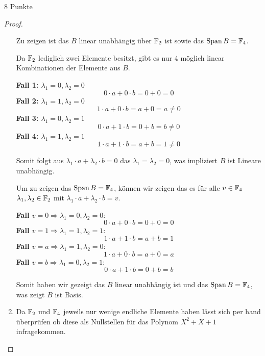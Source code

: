 \documentclass{problemset}
\begin{document}
\begin{problem}{8 Punkte}
\begin{proof}
\begin{enumerate}
              Zu zeigen ist das $B$ linear unabhängig über $\mathbb{F}_2$ ist sowie das
              $\operatorname{Span} B = \mathbb{F}_4$.

              Da $\mathbb{F}_2$ lediglich zwei Elemente besitzt, gibt es nur 4 möglich linear
              Kombinationen der Elemente aus $B$.

              \textbf{Fall 1: $\lambda_1 = 0, \lambda_2 = 0$}
              \[
                  0 \cdot a + 0 \cdot b = 0 + 0 = 0
              \]
              \textbf{Fall 2: $\lambda_1 = 1, \lambda_2 = 0$}
              \[
                  1 \cdot a + 0 \cdot b = a + 0 = a \neq 0
              \]
              \textbf{Fall 3: $\lambda_1 = 0, \lambda_2 = 1$}
              \[
                  0 \cdot a + 1 \cdot b = 0 + b = b \neq 0
              \]
              \textbf{Fall 4: $\lambda_1 = 1, \lambda_2 = 1$}
              \[
                  1 \cdot a + 1 \cdot b = a + b = 1 \neq 0
              \]

              Somit folgt aus $\lambda_1 \cdot a + \lambda_2 \cdot b = 0$ das $\lambda_1 =
                  \lambda_2 = 0$, was impliziert $B$ ist Lineare unabhängig. \checkmark

              Um zu zeigen das $\operatorname{Span} B = \mathbb{F}_4$, können wir zeigen das
              es für alle $v \in \mathbb{F}_4$ $\lambda_1, \lambda_2 \in \mathbb{F}_2$ mit
              $\lambda_1 \cdot a + \lambda_2 \cdot b = v$.

              \textbf{Fall $v = 0 \Rightarrow \lambda_1 = 0, \lambda_2 = 0$}:
              \[
                  0 \cdot a + 0 \cdot b = 0 + 0 = 0
              \]
              \textbf{Fall $v = 1 \Rightarrow \lambda_1 = 1, \lambda_2 = 1$}:
              \[
                  1 \cdot a + 1 \cdot b = a + b = 1
              \]
              \textbf{Fall $v = a \Rightarrow \lambda_1 = 1, \lambda_2 = 0$}:
              \[
                  1 \cdot a + 0 \cdot b = a + 0 = a
              \]
              \textbf{Fall $v = b \Rightarrow \lambda_1 = 0, \lambda_2 = 1$}:
              \[
                  0 \cdot a + 1 \cdot b = 0 + b = b
              \]

              Somit haben wir gezeigt das $B$ linear unabhängig ist und das
              $\operatorname{Span} B = \mathbb{F}_4$, was zeigt $B$ ist Basis.
        \item Da $\mathbb{F}_2$ und $\mathbb{F}_4$ jeweils nur wenige endliche Elemente haben
              lässt sich per hand überprüfen ob diese als Nullstellen für das Polynom $X^2 +
                  X + 1$ infragekommen.


\end{enumerate}
\end{proof}
\end{problem}
\end{document}
